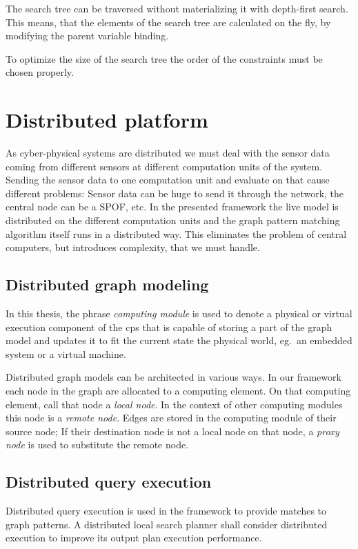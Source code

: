 The search tree can be traversed without materializing it with depth-first search. This means, that the elements of the search tree are calculated on the fly, by modifying the parent variable binding.

To optimize the size of the search tree the order of the constraints must be chosen properly. 

\section{Distributed platform}


As cyber-physical systems are distributed we must deal with the sensor data coming from different sensors at different computation units of the system. 
Sending the sensor data to one computation unit and evaluate on that cause different problems: 
Sensor data can be huge to send it through the network, the central node can be a SPOF, etc. 
In the presented framework the live model is distributed on the different computation units and the graph pattern matching algorithm itself runs in a distributed way. 
This eliminates the problem of central computers, but introduces complexity, that we must handle.

\subsection{Distributed graph modeling}

In this thesis, the phrase \emph{computing module} is used to denote a physical or virtual execution component of the cps that is capable of storing a part of the graph model and updates it to fit the current state the physical world, eg.\ an embedded system or a virtual machine.

Distributed graph models can be architected in various ways. 
In our framework each node in the graph are allocated to a computing element. 
On that computing element, call that node a \emph{local node}. 
In the context of other computing modules this node is a \emph{remote node}. 
Edges are stored in the computing module of their source node; 
If their destination node is not a local node on that node, a \emph{proxy node} is used to substitute the remote node.

\subsection{Distributed query execution}

Distributed query execution is used in the framework to provide matches to graph patterns. 
A distributed local search planner shall consider distributed execution to improve its output plan execution performance.







